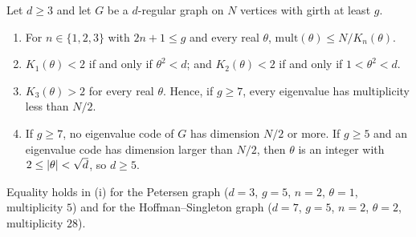 \begin{proposition}\label{prop:E}
\notformalized
Let $d\ge3$ and let $G$ be a $d$-regular graph on $N$ vertices with girth at least $g$.
\begin{enumerate}[label=(\roman*)]
\item For $n\in\{1,2,3\}$ with $2n+1\le g$ and every real $\theta$, $\mathrm{mult}(\theta)\le N/K_n(\theta)$.
\item $K_1(\theta)<2$ if and only if $\theta^2<d$; and $K_2(\theta)<2$ if and only if $1<\theta^2<d$.
\item $K_3(\theta)>2$ for every real $\theta$. Hence, if $g\ge7$, every eigenvalue has multiplicity less than $N/2$.
\item If $g\ge7$, no eigenvalue code of $G$ has dimension $N/2$ or more. If $g\ge5$ and an eigenvalue code has dimension
  larger than $N/2$, then $\theta$ is an integer with $2\le\lvert \theta \rvert<\sqrt d$, so $d\ge5$.
\end{enumerate}
Equality holds in (i) for the Petersen graph ($d=3$, $g=5$, $n=2$, $\theta=1$, multiplicity $5$) and for the
Hoffman--Singleton graph ($d=7$, $g=5$, $n=2$, $\theta=2$, multiplicity $28$).
\end{proposition}

